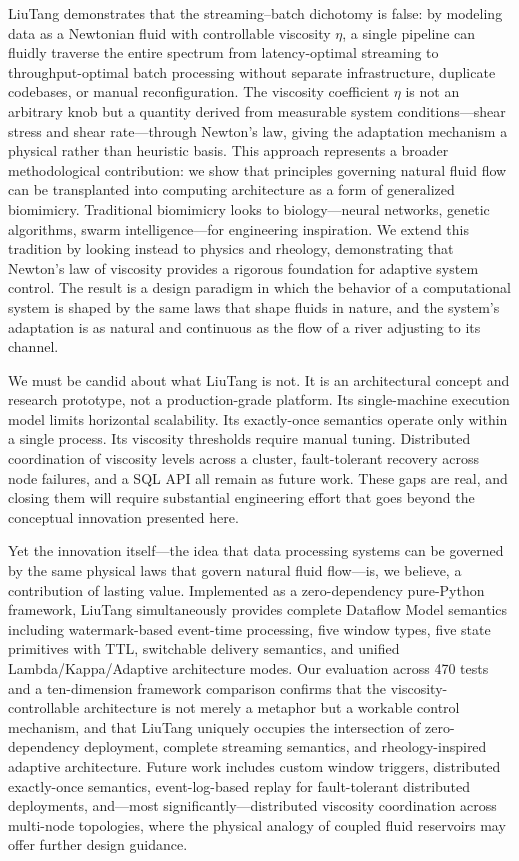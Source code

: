 \documentclass[conference]{IEEEtran}
\begin{document}
LiuTang demonstrates that the streaming--batch dichotomy is false: by modeling data as a Newtonian fluid with controllable viscosity $\eta$, a single pipeline can fluidly traverse the entire spectrum from latency-optimal streaming to throughput-optimal batch processing without separate infrastructure, duplicate codebases, or manual reconfiguration. The viscosity coefficient $\eta$ is not an arbitrary knob but a quantity derived from measurable system conditions---shear stress and shear rate---through Newton's law, giving the adaptation mechanism a physical rather than heuristic basis. This approach represents a broader methodological contribution: we show that principles governing natural fluid flow can be transplanted into computing architecture as a form of generalized biomimicry. Traditional biomimicry looks to biology---neural networks, genetic algorithms, swarm intelligence---for engineering inspiration. We extend this tradition by looking instead to physics and rheology, demonstrating that Newton's law of viscosity provides a rigorous foundation for adaptive system control. The result is a design paradigm in which the behavior of a computational system is shaped by the same laws that shape fluids in nature, and the system's adaptation is as natural and continuous as the flow of a river adjusting to its channel.

We must be candid about what LiuTang is not. It is an architectural concept and research prototype, not a production-grade platform. Its single-machine execution model limits horizontal scalability. Its exactly-once semantics operate only within a single process. Its viscosity thresholds require manual tuning. Distributed coordination of viscosity levels across a cluster, fault-tolerant recovery across node failures, and a SQL API all remain as future work. These gaps are real, and closing them will require substantial engineering effort that goes beyond the conceptual innovation presented here.

Yet the innovation itself---the idea that data processing systems can be governed by the same physical laws that govern natural fluid flow---is, we believe, a contribution of lasting value. Implemented as a zero-dependency pure-Python framework, LiuTang simultaneously provides complete Dataflow Model semantics including watermark-based event-time processing, five window types, five state primitives with TTL, switchable delivery semantics, and unified Lambda/Kappa/Adaptive architecture modes. Our evaluation across 470 tests and a ten-dimension framework comparison confirms that the viscosity-controllable architecture is not merely a metaphor but a workable control mechanism, and that LiuTang uniquely occupies the intersection of zero-dependency deployment, complete streaming semantics, and rheology-inspired adaptive architecture. Future work includes custom window triggers, distributed exactly-once semantics, event-log-based replay for fault-tolerant distributed deployments, and---most significantly---distributed viscosity coordination across multi-node topologies, where the physical analogy of coupled fluid reservoirs may offer further design guidance.
\end{document}
